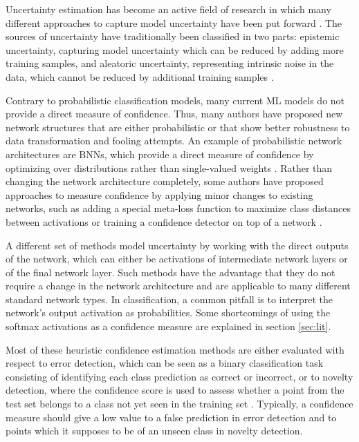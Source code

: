 \documentclass[10pt]{article}
\begin{document}
Uncertainty estimation has become an active field of research in which many different approaches to capture model uncertainty have been put forward \cite{Gal2016Uncertainty, Choi2017UncertaintyAwareLF, KendallG17, subramanya, leibig2017, Sun2018KSconfA}. The sources of uncertainty have traditionally been classified in two parts: epistemic uncertainty, capturing model uncertainty which can be reduced by adding more training samples, and aleatoric uncertainty, representing intrinsic noise in the data, which cannot be reduced by additional training samples \cite{KendallG17}. 

Contrary to probabilistic classification models, many current \gls{ML} models do not provide a direct measure of confidence. Thus, many authors have proposed new network structures that are either probabilistic or that show better robustness to data transformation and fooling attempts. An example of probabilistic network architectures are \glspl{BNN}, which provide a direct measure of confidence by optimizing over distributions rather than single-valued weights \cite{Gal2016Uncertainty, KendallG17}. Rather than changing the network architecture completely, some authors have proposed approaches to measure confidence by applying minor changes to existing networks, such as adding a special meta-loss function to maximize class distances between activations \cite{mandelbaum17} or training a confidence detector on top of a network \cite{Bahat_2018}.

A different set of methods model uncertainty by working with the direct outputs of the network, which can either be activations of intermediate network layers or of the final network layer. Such methods have the advantage that they do not require a change in the network architecture and are applicable to many different standard network types. In classification, a common pitfall is to interpret the network's output activation as probabilities. Some shortcomings of using the softmax activations as a confidence measure are explained in section \ref{sec:lit}.

Most of these heuristic confidence estimation methods are either evaluated with respect to error detection, which can be seen as a binary classification task consisting of identifying each class prediction as correct or incorrect, or to novelty detection, where the confidence score is used to assess whether a point from the test set belongs to a class not yet seen in the training set \cite{mandelbaum17, deMorsier2014thesis}. Typically, a confidence measure should give a low value to a false prediction in error detection and to points which it supposes to be of an unseen class in novelty detection.
\end{document}
